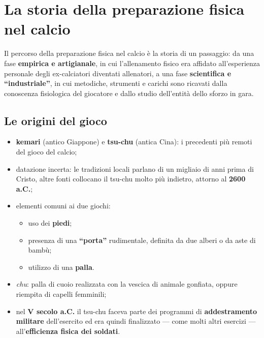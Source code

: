 \chapter{La storia della preparazione fisica nel calcio}
\label{cap:storiaprepfisica}

Il percorso della preparazione fisica nel calcio è la storia di un passaggio: da una fase
\textbf{empirica e artigianale}, in cui l'allenamento fisico era affidato all'esperienza personale
degli ex-calciatori diventati allenatori, a una fase \textbf{scientifica e ``industriale''}, in cui
metodiche, strumenti e carichi sono ricavati dalla conoscenza fisiologica del giocatore e dallo
studio dell'entità dello sforzo in gara.

\section{Le origini del gioco}

\begin{itemize}
  \item \textbf{kemari} (antico Giappone) e \textbf{tsu-chu} (antica Cina): i precedenti più remoti
    del gioco del calcio;
  \item datazione incerta: le tradizioni locali parlano di un migliaio di anni prima di Cristo,
    altre fonti collocano il tsu-chu molto più indietro, attorno al \textbf{2600 a.C.};
  \item elementi comuni ai due giochi:
    \begin{itemize}
      \item uso dei \textbf{piedi};
      \item presenza di una \textbf{``porta''} rudimentale, definita da due alberi o da aste di
        bambù;
      \item utilizzo di una \textbf{palla}.
    \end{itemize}
  \item \textit{chu}: palla di cuoio realizzata con la vescica di animale gonfiata, oppure riempita
    di capelli femminili;
  \item nel \textbf{V secolo a.C.} il tsu-chu faceva parte dei programmi di \textbf{addestramento
    militare} dell'esercito ed era quindi finalizzato --- come molti altri esercizi ---
    all'\textbf{efficienza fisica dei soldati}.
\end{itemize}

